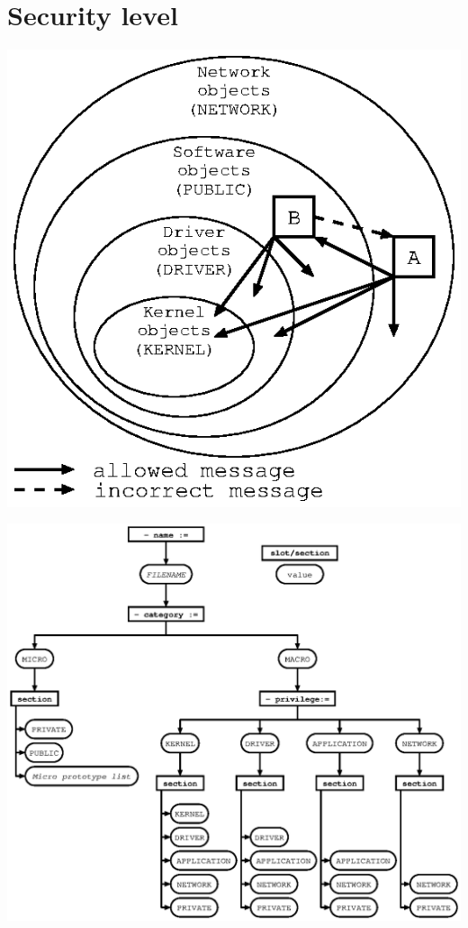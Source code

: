 \documentclass[11pt]{mybook}
\begin{document}
\section{Security level}

\begin{center}
\includegraphics[scale=1.0]{figures/langage2}
\end{center}
\vspace{1cm}
\begin{center}
\includegraphics[scale=1.0]{figures/header}
\end{center}



\nocite{*}


\printindex
\end{document}
